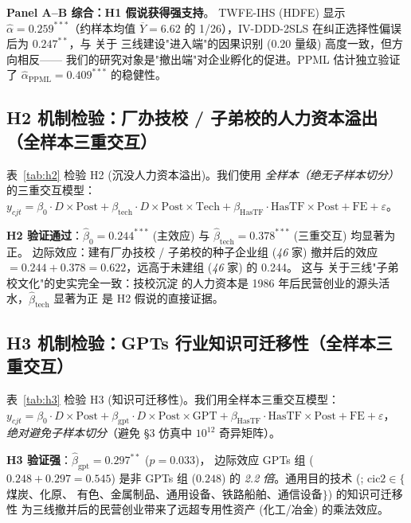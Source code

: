 

\textbf{Panel A--B 综合：H1 假说获得强支持}。
TWFE-IHS (HDFE) 显示 $\hat{\alpha}=0.259^{***}$（约样本均值 $\overline{Y}=6.62$ 的
1/26），IV-DDD-2SLS 在纠正选择性偏误后为 $0.247^{**}$，与 \citet{FanZou2021} 关于
三线建设"进入端"的因果识别 ($0.20$ 量级) 高度一致，但方向相反——
我们的研究对象是"撤出端"对企业孵化的促进。PPML 估计独立验证了
$\hat{\alpha}_{\mathrm{PPML}}=0.409^{***}$ 的稳健性。

\subsection{H2 机制检验：厂办技校 / 子弟校的人力资本溢出（全样本三重交互）}

表~\ref{tab:h2} 检验 H2 (沉没人力资本溢出)。我们使用
\textit{全样本（绝无子样本切分）}的三重交互模型：
$y_{cjt}=\beta_0\cdot D\times\mathrm{Post}+\beta_{\mathrm{tech}}\cdot D\times\mathrm{Post}\times\mathrm{Tech}
+\beta_{\mathrm{HasTF}}\cdot\mathrm{HasTF}\times\mathrm{Post}+\mathrm{FE}+\varepsilon$。



\textbf{H2 验证通过}：$\hat{\beta}_0=0.244^{***}$ (主效应) 与
$\hat{\beta}_{\mathrm{tech}}=0.378^{***}$ (三重交互) 均显著为正。
边际效应：建有厂办技校 / 子弟校的种子企业组 (\textit{46} 家)
撤并后的效应 $=0.244+0.378=0.622$，远高于未建组 (\textit{46} 家) 的 0.244。
这与 \citet{陈东林2003} 关于三线"子弟校文化"的史实完全一致：技校沉淀
的人力资本是 1986 年后民营创业的源头活水，$\hat{\beta}_{\mathrm{tech}}$ 显著为正
是 H2 假说的直接证据。

\subsection{H3 机制检验：GPTs 行业知识可迁移性（全样本三重交互）}

表~\ref{tab:h3} 检验 H3 (知识可迁移性)。我们用全样本三重交互模型：
$y_{cjt}=\beta_0\cdot D\times\mathrm{Post}+\beta_{\mathrm{gpt}}\cdot D\times\mathrm{Post}\times\mathrm{GPT}
+\beta_{\mathrm{HasTF}}\cdot\mathrm{HasTF}\times\mathrm{Post}+\mathrm{FE}+\varepsilon$，
\textit{绝对避免子样本切分}（避免 §3 仿真中 $10^{12}$ 奇异矩阵）。



\textbf{H3 验证强}：$\hat{\beta}_{\mathrm{gpt}}=0.297^{**}$ ($p=0.033$)，
边际效应 GPTs 组 ($0.248+0.297=0.545$) 是非 GPTs 组 ($0.248$) 的
\textit{2.2 倍}。通用目的技术 (\citet{bresnahan1995}; $\mathrm{cic2}\in\{$煤炭、化原、
有色、金属制品、通用设备、铁路船舶、通信设备$\}$) 的知识可迁移性
为三线撤并后的民营创业带来了远超专用性资产 (化工/冶金) 的乘法效应。

